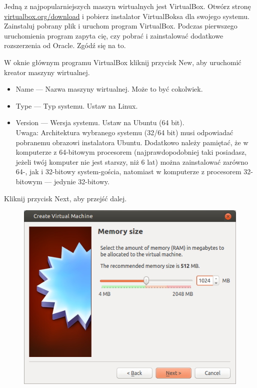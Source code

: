 Jedną z najpopularniejszych maszyn wirtualnych jest VirtualBox. Otwórz stronę \href{https://www.virtualbox.org/wiki/Downloads}{virtualbox.org/download} i pobierz instalator VirtualBoksa dla swojego systemu. Zainstaluj pobrany plik i uruchom program VirtualBox. Podczas pierwszego uruchomienia program zapyta cię, czy pobrać i zainstalować dodatkowe rozszerzenia od Oracle. Zgódź się na to.

W oknie głównym programu VirtualBox kliknij przycisk \textcolor{ubuntu_orange}{New}, aby uruchomić kreator maszyny wirtualnej.

\begin{itemize}
\item \textcolor{ubuntu_orange}{Name} --- Nazwa maszyny wirtualnej. Może to być cokolwiek.
\item \textcolor{ubuntu_orange}{Type} --- Typ systemu. Ustaw na \textcolor{ubuntu_orange}{Linux}.
\item \textcolor{ubuntu_orange}{Version} --- Wersja systemu. Ustaw na \textcolor{ubuntu_orange}{Ubuntu (64 bit)}.\\
Uwaga: Architektura wybranego systemu (32/64 bit) musi odpowiadać pobranemu obrazowi instalatora Ubuntu. Dodatkowo należy pamiętać, że w komputerze z 64-bitowym procesorem (najprawdopodobniej taki posiadasz, jeżeli twój komputer nie jest starszy, niż 6 lat) można zainstalować zarówno 64-, jak i 32-bitowy system-gościa, natomiast w komputerze z procesorem 32-bitowym --- jedynie 32-bitowy.
\end{itemize}
\begin{flushright}
Kliknij przycisk \textcolor{ubuntu_orange}{Next}, aby przejść dalej.
\end{flushright}

\clearpage
\begin{figure}
	\vspace{-10pt}
	\includegraphics[width=\linewidth]{images/virtualbox_wizard2.png}
\end{figure}

